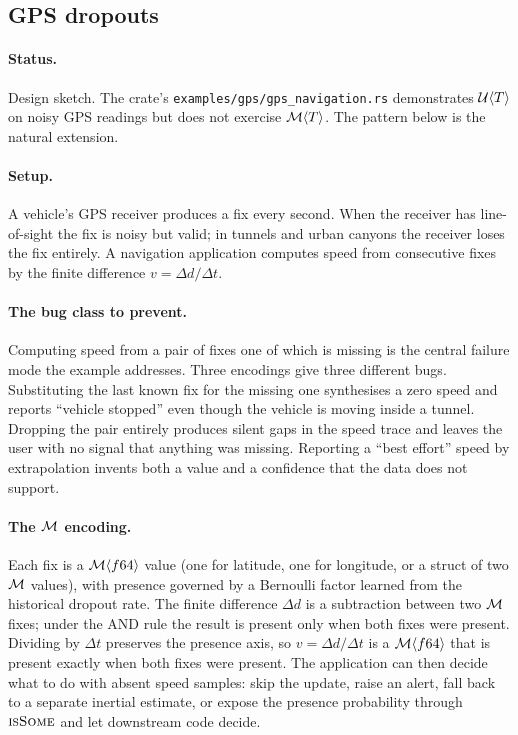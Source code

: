 \subsection{GPS dropouts}
\label{sec:examples:gps}

\paragraph{Status.} Design sketch. The crate's
\texttt{examples/gps/gps\_navigation.rs} demonstrates $\mathcal{U}\langle T
\rangle$ on noisy GPS readings but does not exercise $\mathcal{M}\langle T
\rangle$. The pattern below is the natural extension.

\paragraph{Setup.} A vehicle's GPS receiver produces a fix every second.
When the receiver has line-of-sight the fix is noisy but valid; in
tunnels and urban canyons the receiver loses the fix entirely. A
navigation application computes speed from consecutive fixes by the
finite difference $v = \Delta d / \Delta t$.

\paragraph{The bug class to prevent.} Computing speed from a pair of
fixes one of which is missing is the central failure mode the example
addresses. Three encodings give three different bugs. Substituting the
last known fix for the missing one synthesises a zero speed and reports
``vehicle stopped'' even though the vehicle is moving inside a tunnel.
Dropping the pair entirely produces silent gaps in the speed trace and
leaves the user with no signal that anything was missing. Reporting a
``best effort'' speed by extrapolation invents both a value and a
confidence that the data does not support.

\paragraph{The $\mathcal{M}$ encoding.} Each fix is a $\mathcal{M}\langle f64
\rangle$ value (one for latitude, one for longitude, or a struct of two
$\mathcal{M}$ values), with presence governed by a Bernoulli factor learned
from the historical dropout rate. The finite difference $\Delta d$ is a
subtraction between two $\mathcal{M}$ fixes; under the AND rule the result is
present only when both fixes were present. Dividing by $\Delta t$
preserves the presence axis, so $v = \Delta d / \Delta t$ is a
$\mathcal{M}\langle f64 \rangle$ that is present exactly when both fixes were
present. The application can then decide what to do with absent speed
samples: skip the update, raise an alert, fall back to a separate
inertial estimate, or expose the presence probability through
$\textsc{isSome}$ and let downstream code decide.

